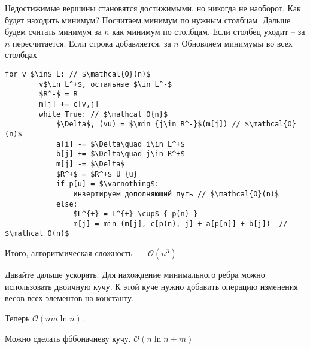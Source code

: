 Недостижимые вершины становятся достижимыми, но никогда не наоборот. Как будет находить минимум?
Посчитаем минимум по нужным столбцам. Дальше будем считать минимум за $n$ как минимум по столбцам.
Если столбец уходит -- за $n$ пересчитается. Если строка добавляется, за $n$ Обновляем минимумы во всех столбцах

\begin{lstlisting}[mathescape=true]
    for v $\in$ L: // $\mathcal{O}(n)$
        v$\in L^+$, остальные $\in L^-$
        $R^-$ = R
        m[j] += c[v,j]
        while True: // $\mathcal O{n}$
            $\Delta$, (vu) = $\min_{j\in R^-}$(m[j]) // $\mathcal{O}(n)$
            a[i] -= $\Delta\quad i\in L^+$
            b[j] += $\Delta\quad j\in R^+$
            m[j] -= $\Delta$
            $R^+$ = $R^+$ U {u}
            if p[u] = $\varnothing$:
                инвертируем дополняющий путь // $\mathcal{O}(n)$
            else:
                $L^{+} = L^{+} \cup$ { p(n) }
                m[j] = min (m[j], c[p(n), j] + a[p[n]] + b[j])  // $\mathcal O(n)$
\end{lstlisting}

Итого, алгоритмическая сложность~--- $\mathcal O(n^3)$.

Давайте дальше ускорять. Для нахождение минимального ребра можно использовать двоичную кучу.
К этой куче нужно добавить операцию изменения весов всех элементов на константу.

Теперь $\mathcal O(nm\ln n)$.

Можно сделать фббоначиеву кучу. $\mathcal O(n\ln n + m)$



